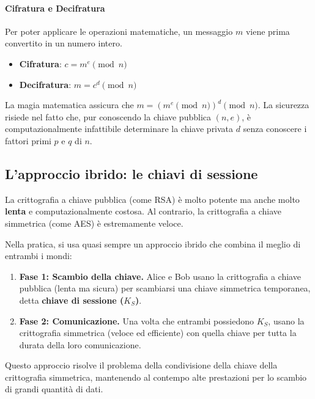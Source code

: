 \paragraph{Cifratura e Decifratura}
Per poter applicare le operazioni matematiche, un messaggio $m$ viene prima convertito in un numero intero.
\begin{itemize}
    \item \textbf{Cifratura}: $c = m^e \pmod n$
    \item \textbf{Decifratura}: $m = c^d \pmod n$
\end{itemize}
La magia matematica assicura che $m = (m^e \pmod n)^d \pmod n$. La sicurezza risiede nel fatto che, pur conoscendo la chiave pubblica $(n, e)$, è computazionalmente infattibile determinare la chiave privata $d$ senza conoscere i fattori primi $p$ e $q$ di $n$.


\subsection{L'approccio ibrido: le chiavi di sessione}

La crittografia a chiave pubblica (come RSA) è molto potente ma anche molto \textbf{lenta} e computazionalmente costosa. Al contrario, la crittografia a chiave simmetrica (come AES) è estremamente veloce.

Nella pratica, si usa quasi sempre un approccio ibrido che combina il meglio di entrambi i mondi:
\begin{enumerate}
    \item \textbf{Fase 1: Scambio della chiave.} Alice e Bob usano la crittografia a chiave pubblica (lenta ma sicura) per scambiarsi una chiave simmetrica temporanea, detta \textbf{chiave di sessione ($K_S$)}.
    \item \textbf{Fase 2: Comunicazione.} Una volta che entrambi possiedono $K_S$, usano la crittografia simmetrica (veloce ed efficiente) con quella chiave per tutta la durata della loro comunicazione.
\end{enumerate}

Questo approccio risolve il problema della condivisione della chiave della crittografia simmetrica, mantenendo al contempo alte prestazioni per lo scambio di grandi quantità di dati.
